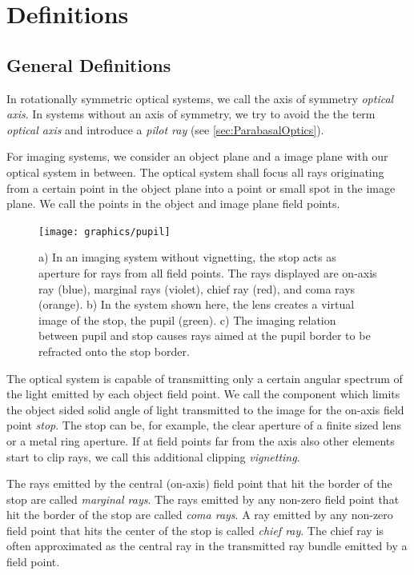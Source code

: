 \documentclass[12pt,a4paper,twoside,openright,BCOR10mm,headsepline,titlepage,abstracton,chapterprefix,final]{scrreprt}
\begin{document}
\section{Definitions}

\subsection{General Definitions}
In rotationally symmetric optical systems, we call the axis of symmetry \emph{optical axis}. 
In systems without an axis of symmetry, we try to avoid the the term \emph{optical axis}
and introduce a \emph{pilot ray} (see \ref{sec:ParabasalOptics}).

For imaging systems, we consider an object plane and a image plane with our optical system in between. 
The optical system shall focus all rays originating from a certain point in the object plane into a point or small spot in the image plane.
We call the points in the object and image plane field points.

\begin{figure}
  \centering
   \texttt{[image: graphics/pupil]}
  \caption{a) In an imaging system without vignetting, the stop acts as aperture for rays from all field points. The rays displayed are on-axis ray (blue), marginal rays (violet), chief ray (red), and coma rays (orange).
  b) In the system shown here, the lens creates a virtual image of the stop, the pupil (green).
  c) The imaging relation between pupil and stop causes rays aimed at the pupil border to be refracted onto the stop border.
  }
  \label{fig:pupil}
\end{figure}

The optical system is capable of transmitting only a certain angular spectrum of the light emitted by each object field point.
We call the component which limits the object sided solid angle of light transmitted to the image for the on-axis field point \emph{stop}.
The stop can be, for example, the clear aperture of a finite sized lens or a metal ring aperture.
If at field points far from the axis also other elements start to clip rays, we call this additional clipping \emph{vignetting}.

The rays emitted by the central (on-axis) field point that hit the border of the stop are called \emph{marginal rays}.
The rays emitted by any non-zero field point that hit the border of the stop are called \emph{coma rays}.
A ray emitted by any non-zero field point that hits the center of the stop is called \emph{chief ray}.
The chief ray is often approximated as the central ray in the transmitted ray bundle emitted by a field point.
\end{document}
